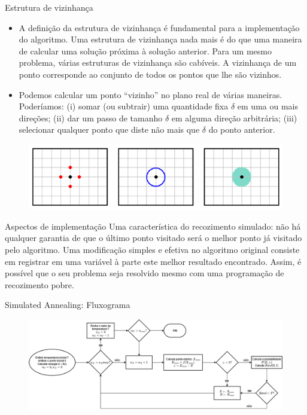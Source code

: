 \documentclass{beamer}
\begin{document}
\begin{frame}{Estrutura de vizinhança}
    \begin{itemize}
        \item A definição da estrutura de vizinhança é fundamental para a implementação do algoritmo.
        Uma estrutura de vizinhança nada mais é do que uma maneira de calcular uma solução próxima à
        solução anterior. Para um mesmo problema, várias estruturas de vizinhança são cabíveis. A
        vizinhança de um ponto corresponde ao conjunto de todos os pontos que lhe são vizinhos.
        \item Podemos calcular um ponto “vizinho” no plano real de várias maneiras. Poderíamos: (i) somar (ou
        subtrair) uma quantidade fixa $\delta$ em uma ou mais direções; (ii) dar um passo de tamanho $\delta$ em
        alguma direção arbitrária; (iii) selecionar qualquer ponto que diste não mais que $\delta$ do ponto
        anterior.
    \end{itemize}
    \begin{figure}
        \includegraphics[scale = 0.5]{src/vizinhanca.png}
    \end{figure}
\end{frame}

\begin{frame}{Aspectos de implementação}
    Uma característica do recozimento simulado: não há qualquer garantia de que o último
ponto visitado será o melhor ponto já visitado pelo algoritmo. Uma modificação simples e efetiva
no algoritmo original consiste em registrar em uma variável à parte este melhor resultado
encontrado. Assim, é possível que o seu problema seja resolvido mesmo com uma programação de
recozimento pobre.
\end{frame}

\begin{frame}{Simulated Annealing: Fluxograma}
    \begin{figure}
        \includegraphics[scale = 0.3]{src/FluxogramaSA.drawio.png}
    \end{figure}
\end{frame}
\end{document}
